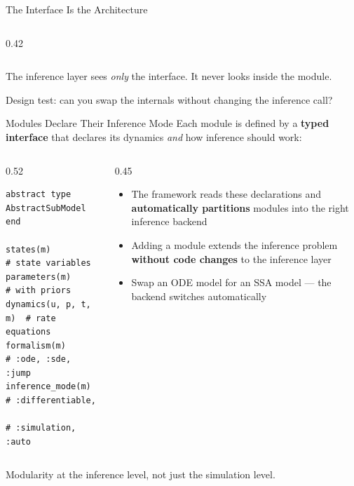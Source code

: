 \documentclass[aspectratio=169]{beamer}
\begin{document}
\begin{frame}[noframenumbering]{The Interface Is the Architecture}
\begin{columns}[T]
\begin{column}{0.42\textwidth}
		\end{column}
	\end{columns}
\vspace{1mm}
The inference layer sees \emph{only} the interface. It never looks inside the module.


	\alert{Design test: can you swap the internals without changing the inference call?}
\end{frame}

\begin{frame}{Modules Declare Their Inference Mode}
	Each module is defined by a \textbf{typed interface} that declares its dynamics \emph{and} how inference should work:

	\bigskip
	\begin{columns}[T]
		\begin{column}{0.52\textwidth}
			\begin{lstlisting}[style=julia]
abstract type AbstractSubModel end

states(m)          # state variables
parameters(m)      # with priors
dynamics(u, p, t, m)  # rate equations
formalism(m)       # :ode, :sde, :jump
inference_mode(m)  # :differentiable,
                   # :simulation, :auto
			\end{lstlisting}
		\end{column}
		\begin{column}{0.45\textwidth}
			\begin{itemize}\itemsep6pt
				\item The framework reads these declarations and \textbf{automatically partitions} modules into the right inference backend
				\item Adding a module extends the inference problem \textbf{without code changes} to the inference layer
				\item Swap an ODE model for an SSA model --- the backend switches automatically
			\end{itemize}
		\end{column}
	\end{columns}

	\vfill
	\centering
	\alert{Modularity at the inference level, not just the simulation level.}
\end{frame}
\end{document}
